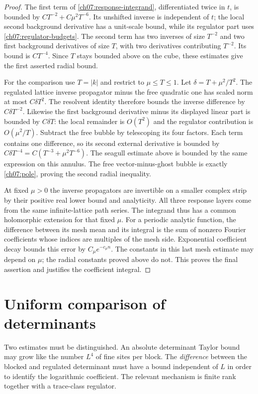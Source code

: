 \begin{proof}
The first term of \eqref{ch07:response-integrand}, differentiated twice
in $t$, is bounded by $CT^{-2}+C\mu^2T^{-6}$. Its unshifted inverse
is independent of $t$; the local second background derivative has a unit-scale
bound, while its regulator part uses \eqref{ch07:regulator-budgets}.
The second term has two inverses of size $T^{-2}$ and two first background derivatives
of size $T$, with two derivatives contributing $T^{-2}$. Its bound is
$CT^{-4}$. Since $T$ stays bounded above on the cube, these estimates
give the first asserted radial bound.

For the comparison use $T=|k|$ and restrict to $\mu\le T\le1$.
Let $\delta=T+\mu^2/T^2$. The regulated lattice inverse propagator minus the free
quadratic one has scaled norm at most $C\delta T^2$.
The resolvent identity therefore bounds the inverse difference by
$C\delta T^{-2}$. Likewise the first background derivative minus its displayed
linear part is bounded by $C\delta T$: the local remainder is
$O(T^2)$ and the regulator contribution is $O(\mu^2/T)$.
Subtract the free bubble by telescoping its four factors. Each term
contains one difference, so its second external derivative is bounded
by $C\delta T^{-4}=C(T^{-3}+\mu^2T^{-6})$.
The seagull estimate above is bounded by the same expression on this
annulus. The free vector-minus-ghost bubble is exactly
\eqref{ch07:pole}, proving the second radial inequality.

At fixed $\mu>0$ the inverse propagators are invertible on a smaller complex
strip by their positive real lower bound and analyticity. All three response
layers come from the same infinite-lattice path series. The integrand
thus has a common holomorphic extension for that fixed $\mu$.
For a periodic analytic function, the difference between its mesh mean
and its integral is the sum of nonzero Fourier coefficients whose
indices are multiples of the mesh side. Exponential coefficient decay
bounds this error by $C_\mu e^{-c_\mu n}$.
The constants in this last mesh estimate may depend on $\mu$;
the radial constants proved above do not. This proves the final assertion
and justifies the coefficient integral.
\end{proof}

\section{Uniform comparison of determinants}\label{ch07:comparison}

Two estimates must be distinguished. An absolute determinant Taylor
bound may grow like the number $L^4$ of fine sites per block. The
\emph{difference} between the blocked and regulated determinant must
have a bound independent of $L$ in order to identify the logarithmic
coefficient. The relevant mechanism is finite rank together with a
trace-class regulator.

